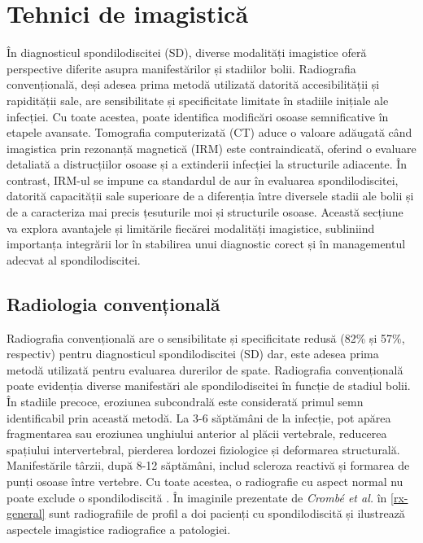 \documentclass[romanian,12pt,a4paper]{article}
\begin{document}
\section{Tehnici de imagistică}

În diagnosticul spondilodiscitei (SD), diverse modalități imagistice
oferă perspective diferite asupra manifestărilor și stadiilor bolii.
Radiografia convențională, deși adesea prima metodă utilizată datorită
accesibilității și rapidității sale, are sensibilitate și specificitate
limitate în stadiile inițiale ale infecției. Cu toate acestea, poate
identifica modificări osoase semnificative în etapele avansate.
Tomografia computerizată (CT) aduce o valoare adăugată când imagistica
prin rezonanță magnetică (IRM) este contraindicată, oferind o evaluare
detaliată a distrucțiilor osoase și a extinderii infecției la
structurile adiacente. În contrast, IRM-ul se impune ca standardul de
aur în evaluarea spondilodiscitei, datorită capacității sale superioare
de a diferenția între diversele stadii ale bolii și de a caracteriza mai
precis țesuturile moi și structurile osoase. Această secțiune va explora
avantajele și limitările fiecărei modalități imagistice, subliniind
importanța integrării lor în stabilirea unui diagnostic corect și în
managementul adecvat al spondilodiscitei.

\subsection{Radiologia convențională}

Radiografia convențională are o sensibilitate și specificitate redusă
(82\% și 57\%, respectiv) pentru diagnosticul spondilodiscitei (SD) dar,
este adesea prima metodă utilizată pentru evaluarea durerilor de spate.
Radiografia convențională poate evidenția diverse manifestări ale
spondilodiscitei în funcție de stadiul bolii. În stadiile precoce,
eroziunea subcondrală este considerată primul semn identificabil prin
această metodă. La 3-6 săptămâni de la infecție, pot apărea fragmentarea
sau eroziunea unghiului anterior al plăcii vertebrale, reducerea
spațiului intervertebral, pierderea lordozei fiziologice și deformarea
structurală. Manifestările târzii, după 8-12 săptămâni, includ scleroza
reactivă și formarea de punți osoase între vertebre. Cu toate acestea, o
radiografie cu aspect normal nu poate exclude o spondilodiscită
\cite{SpondylodiscitisDiagnosisTreatment2017}. În imaginile prezentate de
\emph{Crombé et al.} în \ref{rx-general} sunt
radiografiile de profil a doi pacienți cu spondilodiscită și ilustrează
aspectele imagistice radiografice a patologiei.
\end{document}
